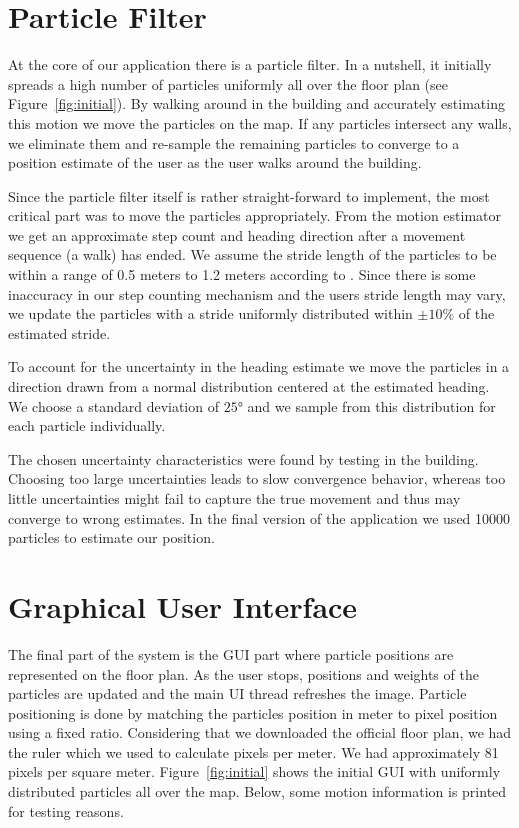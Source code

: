 \documentclass[conference]{IEEEtran}
\begin{document}
\section{Particle Filter}
\label{sec:particlefilter}
At the core of our application there is a particle filter. In a nutshell, it initially spreads a high number of particles uniformly all over the floor plan (see Figure~\ref{fig:initial}). By walking around in the building and accurately estimating this motion we move the particles on the map. If any particles intersect any walls, we eliminate them and re-sample the remaining particles to converge to a position estimate of the user as the user walks around the building. 

Since the particle filter itself is rather straight-forward to implement, the most critical part was to move the particles appropriately. From the motion estimator we get an approximate step count and heading direction after a movement sequence (a walk) has ended. We assume the stride length of the particles to be within a range of 0.5 meters to 1.2 meters according to \cite{zee}. Since there is some inaccuracy in our step counting mechanism and the users stride length may vary, we update the particles with a stride uniformly distributed within $\pm 10\%$ of the estimated stride.

To account for the uncertainty in the heading estimate we move the particles in a direction drawn from a normal distribution centered at the estimated heading. We choose a standard deviation of $25°$ and we sample from this distribution for each particle individually.

The chosen uncertainty characteristics were found by testing in the building. Choosing too large uncertainties leads to slow convergence behavior, whereas too little uncertainties might fail to capture the true movement and thus may converge to wrong estimates. In the final version of the application we used 10000 particles to estimate our position.


\section{Graphical User Interface}
\label{sec:gui}
The final part of the system is the GUI part where particle positions are represented on the floor plan. As the user stops, positions and weights of the particles are updated and the main UI thread refreshes the image. Particle positioning is done by matching the particles position in meter to pixel position using a fixed ratio. Considering that we downloaded the official floor plan, we had the ruler which we used to calculate pixels per meter. We had approximately 81 pixels per square meter. Figure~\ref{fig:initial} shows the initial GUI with uniformly distributed particles all over the map. Below, some motion information is printed for testing reasons. 
\end{document}
